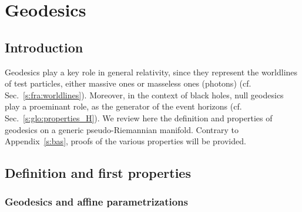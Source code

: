 \chapter{Geodesics} \label{s:geo}

\minitoc

\section{Introduction}

Geodesics play a key role in general relativity, since they represent
the worldlines of test particles, either massive ones or masseless ones (photons)
(cf. Sec.~\ref{s:fra:worldlines}). Moreover, in the context of black holes,
null geodesics play a proeminant role, as the generator of the event horizons
(cf. Sec.~\ref{s:glo:properties_H}). We review here the definition and
properties of geodesics on a generic pseudo-Riemannian manifold.
Contrary to Appendix~\ref{s:bas}, proofs of the various properties will be provided.


\section{Definition and first properties}

\subsection{Geodesics and affine parametrizations} \label{s:geo:def}

